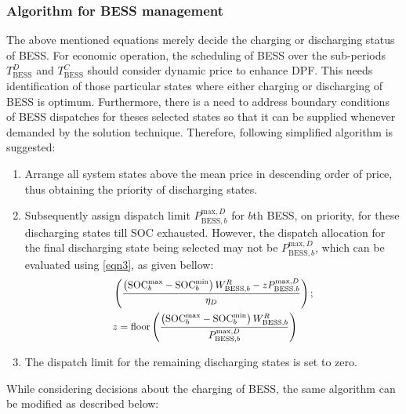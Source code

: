 \documentclass[journal]{IEEEtran}
\begin{document}
\subsubsection{Algorithm for BESS management}\label{Subsection:algorithm for bESS}
The above mentioned equations merely decide the charging or discharging status of BESS. For economic operation, the scheduling of BESS over the sub-periods $T_{\text{BESS}}^{D}$ and $T_{\text{BESS}}^{C}$ should consider dynamic price to enhance DPF. This needs identification of those particular states where either charging or discharging of BESS is optimum. Furthermore, there is a need to address boundary conditions of BESS dispatches for theses selected states so that it can be supplied whenever demanded by the solution technique. Therefore, following simplified algorithm is suggested:
\begin{enumerate}
		\item Arrange all system states above the mean price in descending order of price, thus obtaining the priority of discharging states.
		\item Subsequently assign dispatch limit  $P_{\text{BESS},b}^{\text{max},D}$ for $b$th BESS, on priority, for these discharging states till SOC exhausted. However, the dispatch allocation for the final discharging state being selected may not be $P_{\text{BESS},b}^{\text{max},D}$, which can be evaluated using \eqref{eqn3}, as given bellow:
		 \begin{equation}
		 	\scalebox{0.9}[0.9]{$
		 \begin{split}
		 & \left( \frac{\left( \text{SOC}_{b}^{\text{max}}-\text{SOC}_{b}^{\text{min}} \right)W_{\text{BESS},b}^{R}-zP_{\text{BESS},b}^{\text{max},D}}{{{\eta }_{D}}} \right); \\ & z=\text{floor}\left( \frac{\left( \text{SOC}_{b}^{\text{max}}-\text{SOC}_{b}^{\text{min}} \right)W_{\text{BESS},b}^{R}}{P_{\text{BESS},b}^{\text{max},D}} \right)
		 \end{split}
		 $}
		 \label{eqn3}
		 \end{equation}
\item The dispatch limit for the remaining discharging states is set to zero.
\end{enumerate} 
While considering decisions about the charging of BESS, the same algorithm can be modified as described below:
\end{document}
